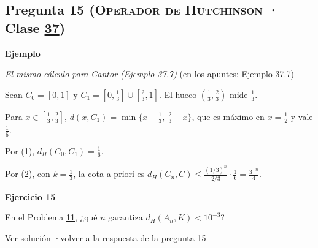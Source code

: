 \documentclass[11pt,a4paper]{article}
\providecommand{\lt}{<}\providecommand{\gt}{>}
\newcommand{\bloque}[1]{\par\smallskip\noindent\textbf{\color{acento}#1}\par}
\begin{document}
\subsection*{\hypertarget{e-15}{}Pregunta 15 \normalfont\small(\textsc{Operador de Hutchinson} · Clase \href{https://decostruttivismo.github.io/MAT2514-repaso/pdf/MAT2514_apuntes_completos.pdf\#nameddest=section.37}{37})}
\bloque{Ejemplo}
\textit{El mismo cálculo para Cantor (\href{https://decostruttivismo.github.io/MAT2514-repaso/pdf/MAT2514_apuntes_completos.pdf\#nameddest=teorema.37.7}{Ejemplo 37.7})} {\small(en los apuntes: \href{https://decostruttivismo.github.io/MAT2514-repaso/pdf/MAT2514_apuntes_completos.pdf\#nameddest=teorema.37.7}{Ejemplo 37.7})}
\begin{pasos}
\item[] Sean $C_0=[0,1]$ y $C_1=[0,\frac13]\cup[\frac23,1]$. El hueco $(\frac13,\frac23)$ mide $\frac13$.
\item[(1)] Para $x\in[\frac13,\frac23]$, $d(x,C_1)=\min\{x-\frac13,\ \frac23-x\}$, que es máximo en $x=\frac12$ y vale $\frac16$.
\item[(2)] Por (1), $d_H(C_0,C_1)=\frac16$.
\item[] Por (2), con $k=\frac13$, la cota a priori es $d_H(C_n,C)\le\frac{(1/3)^n}{2/3}\cdot\frac16=\frac{3^{-n}}4$.
\end{pasos}
\bloque{\hypertarget{x-15}{}Ejercicio 15}
En el Problema \hyperlink{prob-11}{11}, ¿qué $n$ garantiza $d_H(A_n,K)\lt 10^{-3}$?
\par{\small \hyperlink{s-15}{Ver solución} \quad·\quad \hyperlink{r-15}{volver a la respuesta de la pregunta 15}}
\end{document}
